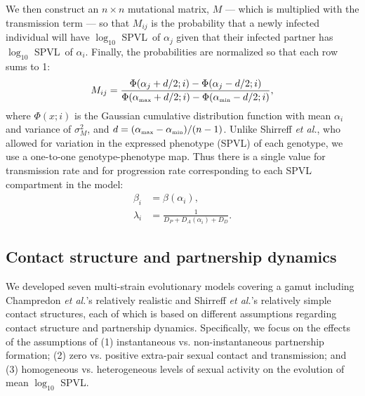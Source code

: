 \documentclass[10pt,letterpaper]{article}
\newcommand{\Lspvl}{$\log_{10}$ SPVL}
\newcommand{\etal}{\textit{et al.}}
\newcommand{\tsub}[2]{#1_{{\textrm{\tiny #2}}}}
\begin{document}
We then construct an $n \times n$ mutational matrix, $M$ --- which is multiplied with the transmission term ---  so that $M_{ij}$ is the probability that a newly infected individual will have \Lspvl\ of $\alpha_j$ given that their infected partner has \Lspvl\ of $\alpha_i$. Finally, the probabilities are normalized so that each row sums to 1:
\begin{equation}
M_{ij} = \frac{\Phi(\alpha_j + d/2;i) - \Phi(\alpha_j - d/2;i)}{\Phi(\tsub{\alpha}{max} + d/2;i) - \Phi(\tsub{\alpha}{min} - d/2;i)},
\end{equation}
where $\Phi(x;i)$ is the Gaussian cumulative distribution function with mean $\alpha_i$ and variance of $\sigma_M^2$, and $d = (\tsub{\alpha}{max} - \tsub{\alpha}{min})/(n-1)$. 
Unlike Shirreff \etal, who allowed for variation in the expressed phenotype (SPVL) of each genotype,
we use a one-to-one genotype-phenotype map. Thus there is a single value for transmission rate and
for progression rate corresponding to each SPVL compartment in the model:
\begin{equation}
\begin{aligned}
\beta_i &= \beta(\alpha_i),\\
\lambda_i &= \frac{1}{D_P + D_A (\alpha_i) + D_D}.
\end{aligned}
\end{equation}

\subsection*{Contact structure and partnership dynamics}

We developed seven multi-strain evolutionary models covering a gamut including Champredon \etal's relatively realistic \cite{champredon_hiv_2013} and Shirreff \etal's relatively simple \cite{shirreff_transmission_2011} contact structures, each of which is based on different assumptions regarding contact structure and partnership dynamics. Specifically, we focus on the effects of the assumptions of (1) instantaneous vs. non-instantaneous partnership formation; (2) zero vs. positive extra-pair sexual contact and transmission; and (3) homogeneous vs. heterogeneous levels of sexual activity on the evolution of mean \Lspvl.
\end{document}
